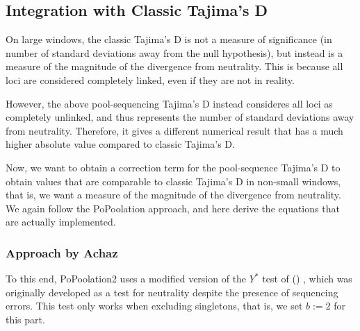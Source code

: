 \documentclass[a4paper,9pt,DIV=14]{scrartcl}
\newcounter{todo}
\newcommand\todo[1]{}
\newcommand\citeay[1]{\citeauthor{#1} (\citeyear{#1}) \cite{#1}}
\begin{document}
\subsection{Integration with Classic Tajima's D}
\label{supp:sec:TajimaD:sub:Classic}

On large windows, the classic Tajima's D is not a measure of significance (in number of standard deviations away from the null hypothesis), but instead is a measure of the magnitude of the divergence from neutrality.
This is because all loci are considered completely linked, even if they are not in reality.

However, the above pool-sequencing Tajima's D instead consideres all loci as completely unlinked, \todo{Moi, Jeff, is that the case? (Moi answer) The above method is unlinked, I believe, because the difference is computed per SNP. The classic} and thus represents the number of standard deviations away from neutrality.
Therefore, it gives a different numerical result that has a much higher absolute value compared to classic Tajima's D.

Now, we want to obtain a correction term for the pool-sequence Tajima's D to obtain values that are comparable to classic Tajima's D in non-small windows, that is, we want a measure of the magnitude of the divergence from neutrality.
We again follow the PoPoolation approach, and here derive the equations that are actually implemented.


\subsubsection*{Approach by Achaz}

To this end, PoPoolation2 uses a modified version of the $Y^*$ test of \citeay{Achaz2008},
which was originally developed as a test for neutrality despite the presence of sequencing errors.
This test only works when excluding singletons, that is, we set $b:=2$ for this part.
\end{document}
